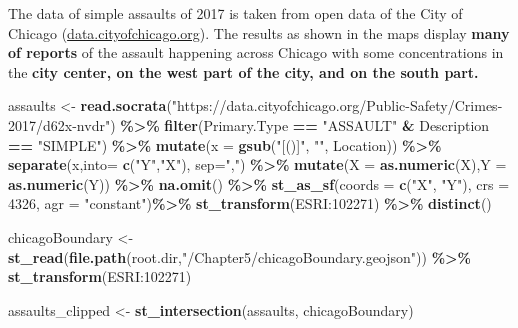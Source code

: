 \documentclass[
]{article}
\newenvironment{Shaded}{\begin{snugshade}}{\end{snugshade}}
\newcommand{\AttributeTok}[1]{\textcolor[rgb]{0.13,0.29,0.53}{#1}}
\newcommand{\DecValTok}[1]{\textcolor[rgb]{0.00,0.00,0.81}{#1}}
\newcommand{\FunctionTok}[1]{\textcolor[rgb]{0.13,0.29,0.53}{\textbf{#1}}}
\newcommand{\NormalTok}[1]{#1}
\newcommand{\OtherTok}[1]{\textcolor[rgb]{0.56,0.35,0.01}{#1}}
\newcommand{\SpecialCharTok}[1]{\textcolor[rgb]{0.81,0.36,0.00}{\textbf{#1}}}
\newcommand{\StringTok}[1]{\textcolor[rgb]{0.31,0.60,0.02}{#1}}
\begin{document}
The data of simple assaults of 2017 is taken from open data of the City
of Chicago (\url{data.cityofchicago.org}). The results as shown in the
maps display \textbf{many of reports} of the assault happening across
Chicago with some concentrations in the \textbf{city center, on the west
part of the city, and on the south part.}

\begin{Shaded}
\begin{Highlighting}[]
\NormalTok{assaults }\OtherTok{\textless{}{-}}
  \FunctionTok{read.socrata}\NormalTok{(}\StringTok{"https://data.cityofchicago.org/Public{-}Safety/Crimes{-}2017/d62x{-}nvdr"}\NormalTok{) }\SpecialCharTok{\%\textgreater{}\%} 
    \FunctionTok{filter}\NormalTok{(Primary.Type }\SpecialCharTok{==} \StringTok{"ASSAULT"} \SpecialCharTok{\&}\NormalTok{ Description }\SpecialCharTok{==} \StringTok{"SIMPLE"}\NormalTok{) }\SpecialCharTok{\%\textgreater{}\%}
    \FunctionTok{mutate}\NormalTok{(}\AttributeTok{x =} \FunctionTok{gsub}\NormalTok{(}\StringTok{"[()]"}\NormalTok{, }\StringTok{""}\NormalTok{, Location)) }\SpecialCharTok{\%\textgreater{}\%}
    \FunctionTok{separate}\NormalTok{(x,}\AttributeTok{into=} \FunctionTok{c}\NormalTok{(}\StringTok{"Y"}\NormalTok{,}\StringTok{"X"}\NormalTok{), }\AttributeTok{sep=}\StringTok{","}\NormalTok{) }\SpecialCharTok{\%\textgreater{}\%}
    \FunctionTok{mutate}\NormalTok{(}\AttributeTok{X =} \FunctionTok{as.numeric}\NormalTok{(X),}\AttributeTok{Y =} \FunctionTok{as.numeric}\NormalTok{(Y)) }\SpecialCharTok{\%\textgreater{}\%} 
    \FunctionTok{na.omit}\NormalTok{() }\SpecialCharTok{\%\textgreater{}\%}
    \FunctionTok{st\_as\_sf}\NormalTok{(}\AttributeTok{coords =} \FunctionTok{c}\NormalTok{(}\StringTok{"X"}\NormalTok{, }\StringTok{"Y"}\NormalTok{), }\AttributeTok{crs =} \DecValTok{4326}\NormalTok{, }\AttributeTok{agr =} \StringTok{"constant"}\NormalTok{)}\SpecialCharTok{\%\textgreater{}\%}
    \FunctionTok{st\_transform}\NormalTok{(}\StringTok{\textquotesingle{}ESRI:102271\textquotesingle{}}\NormalTok{) }\SpecialCharTok{\%\textgreater{}\%} 
    \FunctionTok{distinct}\NormalTok{()}

\NormalTok{chicagoBoundary }\OtherTok{\textless{}{-}} 
  \FunctionTok{st\_read}\NormalTok{(}\FunctionTok{file.path}\NormalTok{(root.dir,}\StringTok{"/Chapter5/chicagoBoundary.geojson"}\NormalTok{)) }\SpecialCharTok{\%\textgreater{}\%}
  \FunctionTok{st\_transform}\NormalTok{(}\StringTok{\textquotesingle{}ESRI:102271\textquotesingle{}}\NormalTok{)}

\NormalTok{assaults\_clipped }\OtherTok{\textless{}{-}} \FunctionTok{st\_intersection}\NormalTok{(assaults, chicagoBoundary)}
\end{Highlighting}
\end{Shaded}
\end{document}
